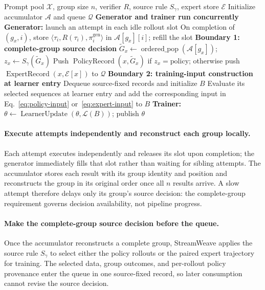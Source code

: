 \documentclass[letterpaper]{article}
\begin{document}
\begin{algorithm}[t]
\caption{StreamWeave control flow; bold boundary labels match Figure~\ref{fig:data-state-boundaries}.}
\label{alg:streamweave}
\begin{algorithmic}[1]
\REQUIRE Prompt pool $\mathcal{X}$, group size $n$, verifier $R$, source rule $S_\gamma$, expert store $\mathcal{E}$
\STATE Initialize accumulator $\mathcal{A}$ and queue $\mathcal{Q}$
\STATE \textbf{Generator and trainer run concurrently}
\STATE \textbf{Generator:} launch an attempt in each idle rollout slot
\STATE On completion of $(g_x,i)$, store
$\langle\tau_i,R(\tau_i),\pi_i^{\mathrm{gen}}\rangle$ in $\mathcal{A}[g_x][i]$; refill the slot
  \STATE \textbf{Boundary 1: complete-group source decision}
  \STATE $\widetilde G_x\leftarrow\operatorname{ordered\_pop}(\mathcal{A}[g_x])$;
  $z_x\leftarrow S_\gamma(\widetilde G_x)$
  \STATE Push $\operatorname{PolicyRecord}(x,\widetilde G_x)$ if $z_x=\mathrm{policy}$;
  otherwise push $\operatorname{ExpertRecord}(x,\mathcal{E}[x])$ to $\mathcal{Q}$
\ENDIF
\STATE \textbf{Boundary 2: training-input construction at learner entry}
\STATE Dequeue source-fixed records and initialize $B$
  \STATE Evaluate its selected sequences at learner entry and add the corresponding input in Eq.~\ref{eq:policy-input} or~\ref{eq:expert-input} to $B$
\ENDFOR
\STATE \textbf{Trainer:} $\theta\leftarrow\operatorname{LearnerUpdate}(\theta,\mathcal{L}(B))$; publish $\theta$
\end{algorithmic}
\end{algorithm}

\paragraph{Execute attempts independently and reconstruct each group locally.}
Each attempt executes independently and releases its slot upon completion; the generator immediately fills that slot rather than waiting for sibling attempts.
The accumulator stores each result with its group identity and position and reconstructs the group in its original order once all $n$ results arrive.
A slow attempt therefore delays only its group's source decision: the complete-group requirement governs decision availability, not pipeline progress.

\paragraph{Make the complete-group source decision before the queue.}
Once the accumulator reconstructs a complete group, StreamWeave applies the source rule $S_\gamma$ to select either the policy rollouts or the paired expert trajectory for training.
The selected data, group outcomes, and per-rollout policy provenance enter the queue in one source-fixed record, so later consumption cannot revise the source decision.
\end{document}
